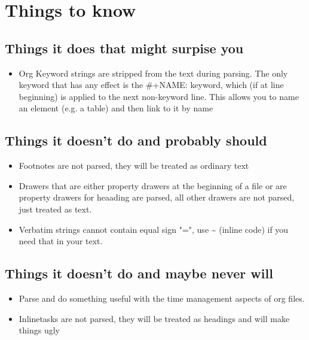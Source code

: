 \documentclass[11pt]{article}
\begin{document}
\section{Things to know  }
 \label{obj-133}
 \label{obj-132}
\vspace{\baselineskip}
\subsection{Things it does that might surpise you  }
 \label{obj-137}
 \label{obj-136}
\begin{itemize}
\item
Org Keyword strings are stripped from the text during parsing. The only keyword that has
  any effect is the \#+NAME: keyword, which (if at line beginning) is applied to the next
  non-keyword line. This allows you to name an element (e.g. a table) and then link to
  it by name

\end{itemize}
\subsection{Things it doesn't do and probably should  }
 \label{obj-147}
 \label{obj-146}
\begin{itemize}
\item
Footnotes are not parsed, they will be treated as ordinary text
\item
Drawers that are either property drawers at the beginning of a file or are property drawers for
  heaading are parsed, all other drawers are not parsed, just treated as text.

\item
Verbatim strings cannot contain equal sign "=", use \textasciitilde{} (inline code) if you need that in your text.
\end{itemize}
\subsection{Things it doesn't do and maybe never will  }
 \label{obj-159}
 \label{obj-158}
\begin{itemize}
\item
Parse and do something useful with the time management aspects of org files.
\item
Inlinetasks are not parsed, they will be treated as headings and will make things ugly
\end{itemize}
\end{document}
